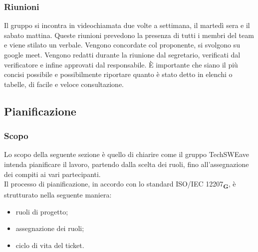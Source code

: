\subsubsection{Riunioni}
Il gruppo si incontra in videochiamata due volte a settimana, il martedì sera e il sabato mattina. Queste riunioni prevedono la presenza di tutti i membri del team e viene stilato un verbale.
Vengono concordate col proponente, si svolgono su google meet.
Vengono redatti durante la riunione dal segretario, verificati dal verificatore e infine approvati dal responsabile. \`E importante che siano il più concisi possibile e possibilmente riportare quanto è stato detto in elenchi o tabelle, di facile e veloce consultazione.
\subsection{Pianificazione}
\subsubsection{Scopo}
Lo scopo della seguente sezione è quello di chiarire come il gruppo TechSWEave intenda pianificare il lavoro, partendo dalla scelta dei ruoli, fino all'assegnazione dei compiti ai vari partecipanti.\\
Il processo di pianificazione, in accordo con lo standard ISO/IEC 12207\textsubscript{\textbf{G}}, è strutturato nella seguente maniera:
\begin {itemize}
    \item ruoli di progetto;
    \item assegnazione dei ruoli;
    \item ciclo di vita del ticket.
\end {itemize}
